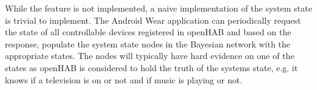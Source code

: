 While the feature is not implemented, a naive implementation of the system state is trivial to implement. The Android Wear application can periodically request the state of all controllable devices registered in openHAB and based on the response, populate the system state nodes in the Bayesian network with the appropriate states. The nodes will typically have hard evidence on one of the states as openHAB is considered to hold the truth of the systems state, e.g. it knows if a television is on or not and if music is playing or not.

